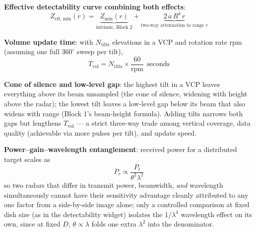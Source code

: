 \documentclass[11pt]{article}
\begin{document}
\textbf{Effective detectability curve combining both effects}:
\begin{equation}
Z_{\mathrm{eff,\,min}}(r) = \underbrace{Z_{\min}(r)}_{\text{intrinsic, Block 2}} + \underbrace{2\,a\,R^{b}\,r}_{\text{two-way attenuation to range }r}
\end{equation}

\textbf{Volume update time}: with $N_{\mathrm{tilts}}$ elevations in a VCP and rotation rate $\mathrm{rpm}$ (assuming one full $360^\circ$ sweep per tilt),
\begin{equation}
T_{\mathrm{vol}} = N_{\mathrm{tilts}}\times\frac{60}{\mathrm{rpm}}\ \ \text{seconds}
\end{equation}

\textbf{Cone of silence and low-level gap}: the highest tilt in a VCP leaves everything above its beam unsampled (the cone of silence, widening with height above the radar); the lowest tilt leaves a low-level gap below its beam that also widens with range (Block 1's beam-height formula). Adding tilts narrows both gaps but lengthens $T_{\mathrm{vol}}$ --- a strict three-way trade among vertical coverage, data quality (achievable via more pulses per tilt), and update speed.

\textbf{Power--gain--wavelength entanglement}: received power for a distributed target scales as
\begin{equation}
P_r \propto \frac{P_t}{\theta^2\lambda^2}
\end{equation}
so two radars that differ in transmit power, beamwidth, \emph{and} wavelength simultaneously cannot have their sensitivity advantage cleanly attributed to any one factor from a side-by-side image alone; only a controlled comparison at fixed dish size (as in the detectability widget) isolates the $1/\lambda^4$ wavelength effect on its own, since at fixed $D$, $\theta\propto\lambda$ folds one extra $\lambda^2$ into the denominator.
\end{document}
